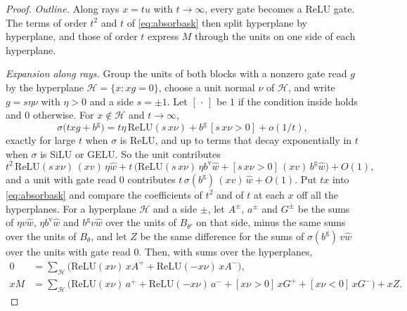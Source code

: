 \documentclass[10pt]{article}
\theoremstyle{definition}
\theoremstyle{remark}
\begin{document}
\begin{proof}
\emph{Outline.} Along rays $x = tu$ with $t \to \infty$, every gate becomes a ReLU gate. The terms of order $t^2$ and $t$ of \eqref{eq:absorbask} then split hyperplane by hyperplane, and those of order $t$ express $M$ through the units on one side of each hyperplane.

\emph{Expansion along rays.} Group the units of both blocks with a nonzero gate read $g$ by the hyperplane $\mathcal H = \{x : xg = 0\}$, choose a unit normal $\nu$ of $\mathcal H$, and write $g = s\eta\nu$ with $\eta > 0$ and a side $s = \pm1$. Let $[\,\cdot\,]$ be $1$ if the condition inside holds and $0$ otherwise. For $x \notin \mathcal H$ and $t \to \infty$,
\[
\sigma\big(txg + b^{\mathrm g}\big) = t\eta\,\mathrm{ReLU}(s\,x\nu) + b^{\mathrm g}\,[s\,x\nu > 0] + o(1/t),
\]
exactly for large $t$ when $\sigma$ is ReLU, and up to terms that decay exponentially in $t$ when $\sigma$ is SiLU or GELU. So the unit contributes
\[
t^2\,\mathrm{ReLU}(s\,x\nu)\,(xv)\,\eta\hat w + t\,\big(\mathrm{ReLU}(s\,x\nu)\,\eta b^{\mathrm v}\hat w + [s\,x\nu > 0]\,(xv)\,b^{\mathrm g}\hat w\big) + O(1),
\]
and a unit with gate read $0$ contributes $t\,\sigma(b^{\mathrm g})\,(xv)\,\hat w + O(1)$. Put $tx$ into \eqref{eq:absorbask} and compare the coefficients of $t^2$ and of $t$ at each $x$ off all the hyperplanes. For a hyperplane $\mathcal H$ and a side $\pm$, let $A^\pm$, $a^\pm$ and $G^\pm$ be the sums of $\eta v\hat w$, $\eta b^{\mathrm v}\hat w$ and $b^{\mathrm g}v\hat w$ over the units of $B_{\theta'}$ on that side, minus the same sums over the units of $B_\theta$, and let $Z$ be the same difference for the sums of $\sigma(b^{\mathrm g})\,v\hat w$ over the units with gate read $0$. Then, with sums over the hyperplanes,
\begin{align*}
0 &= \textstyle\sum_{\mathcal H}\big(\mathrm{ReLU}(x\nu)\,xA^+ + \mathrm{ReLU}(-x\nu)\,xA^-\big),\\
xM &= \textstyle\sum_{\mathcal H}\big(\mathrm{ReLU}(x\nu)\,a^+ + \mathrm{ReLU}(-x\nu)\,a^- + [x\nu > 0]\,xG^+ + [x\nu < 0]\,xG^-\big) + xZ .
\end{align*}


\end{proof}
\end{document}
